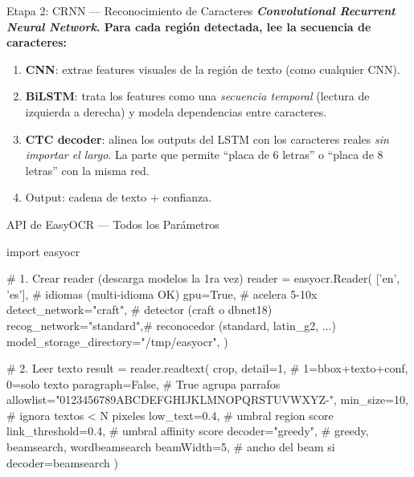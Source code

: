 \documentclass[aspectratio=169, 11pt]{beamer}
\begin{document}
\begin{frame}[shrink]{Etapa 2: CRNN --- Reconocimiento de Caracteres}
  \vspace{6pt}
  {\footnotesize\color{arcaDark}\bfseries
    \emph{Convolutional Recurrent Neural Network}. Para cada regi\'on
    detectada, lee la secuencia de caracteres:}

  \vspace{12pt}
  {\footnotesize
  \begin{enumerate}\setlength{\itemsep}{6pt}
    \item[{\color{arcaRed}\bfseries 1.}]
      \textbf{CNN}: extrae features visuales de la regi\'on de texto
      (como cualquier CNN).
    \item[{\color{arcaRed}\bfseries 2.}]
      \textbf{BiLSTM}: trata los features como una \emph{secuencia
      temporal} (lectura de izquierda a derecha) y modela
      dependencias entre caracteres.
    \item[{\color{arcaRed}\bfseries 3.}]
      \textbf{CTC decoder}: alinea los outputs del LSTM con los
      caracteres reales \emph{sin importar el largo}. La parte que
      permite ``placa de 6 letras'' o ``placa de 8 letras'' con la
      misma red.
    \item[{\color{codeGreen}\bfseries 4.}]
      Output: cadena de texto + confianza.
  \end{enumerate}
  }
\end{frame}

\begin{frame}{API de EasyOCR --- Todos los Par\'ametros}
  \vspace{-4pt}
  \begin{pyblock}
import easyocr

# 1. Crear reader (descarga modelos la 1ra vez)
reader = easyocr.Reader(
    ['en', 'es'],            # idiomas (multi-idioma OK)
    gpu=True,                # acelera 5-10x
    detect_network="craft",  # detector (craft o dbnet18)
    recog_network="standard",# reconocedor (standard, latin_g2, ...)
    model_storage_directory="/tmp/easyocr",
)

# 2. Leer texto
result = reader.readtext(
    crop,
    detail=1,           # 1=bbox+texto+conf, 0=solo texto
    paragraph=False,    # True agrupa parrafos
    allowlist="0123456789ABCDEFGHIJKLMNOPQRSTUVWXYZ-",
    min_size=10,        # ignora textos < N pixeles
    low_text=0.4,       # umbral region score
    link_threshold=0.4, # umbral affinity score
    decoder="greedy",   # greedy, beamsearch, wordbeamsearch
    beamWidth=5,        # ancho del beam si decoder=beamsearch
)
  \end{pyblock}
\end{frame}
\end{document}

